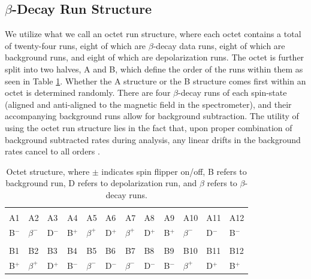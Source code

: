 \subsection{$\beta$-Decay Run Structure}
We utilize what we call an octet run structure, where each octet contains a total of twenty-four
runs, eight of which are $\beta$-decay data runs, eight of which are background runs, and eight
of which are depolarization runs. The octet is further split into two halves, A and B, which define
the order of the runs within them as seen in Table \ref{tab:octetStructure}. Whether the A structure
or the B structure comes first within an octet is determined randomly. There are four $\beta$-decay
runs of each spin-state (aligned and anti-aligned to the magnetic field in the spectrometer), and their
accompanying background runs allow for background subtraction. 
The utility of using the octet run structure lies in the fact that, upon proper combination of background
subtracted rates during analysis, any linear drifts in the background rates cancel to all orders \cite{plaster2012}.


\begin{table}[h]
  \caption{Octet structure, where $\pm$ indicates spin flipper on/off,
    B refers to background run, D refers to depolarization run, and $\beta$
    refers to $\beta$-decay runs.} 
  \centering
  \begin{tabular}{llllllllllll}
    \hline \hline \\ [-1.75ex]
    A1 & A2 & A3 & A4 & A5 & A6 & A7 & A8 & A9 & A10 & A11 & A12 \\ 
    B$^-$ & $\beta^-$ & D$^-$ & B$^+$ & $\beta^+$ & D$^+$ & $\beta^+$ & D$^+$ & B$^+$ & $\beta^-$ & D$^-$ & B$^-$ \\
    \hline \\ [-1.75ex]
    B1 & B2 & B3 & B4 & B5 & B6 & B7 & B8 & B9 & B10 & B11 & B12 \\
    B$^+$ & $\beta^+$ & D$^+$ & B$^-$ & $\beta^-$ & D$^-$ & $\beta^-$ & D$^-$ & B$^-$ & $\beta^+$ & D$^+$ & B$^+$ \\
    \hline
  \end{tabular}
  \label{tab:octetStructure}
\end{table}





